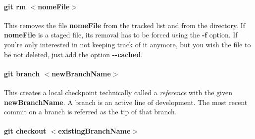 \documentclass[a4paper, 12pt]{article}
\begin{document}
\paragraph{git rm $<$nomeFile$>$} This removes the file \textbf{nomeFile} from the tracked list and from the directory. If \textbf{nomeFile} is a staged file, its removal has to be forced using the \textbf{-f} option. If you're only interested in not keeping track of it anymore, but you wish the file to be not deleted, just add the option \textbf{-{}-cached}.








\paragraph{git branch $<$newBranchName$>$}
This creates a local checkpoint technically called a \emph{reference} with the given \textbf{newBranchName}. A branch is an active line of development. The most recent commit on a branch is referred as the tip of that branch.

\paragraph{git checkout $<$existingBranchName$>$}
\end{document}
